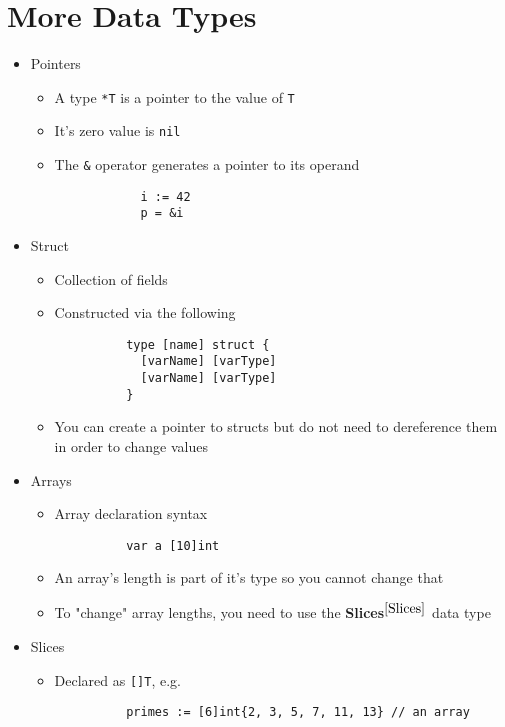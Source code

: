 \documentclass[11pt, oneside]{article}   	%
\begin{document}
\section{More Data Types}
  \begin{itemize}
    \item Pointers
      \begin{itemize}
        \item A type \texttt{*T} is a pointer to the value of \texttt{T}
        \item It's zero value is \texttt{nil}
        \item The \texttt{\&} operator generates a pointer to its operand
          \begin{verbatim}
            i := 42
            p = &i
          \end{verbatim}
      \end{itemize}
    \item Struct
      \begin{itemize}
        \item Collection of fields
        \item Constructed via the following
          \begin{verbatim}
          type [name] struct {
            [varName] [varType]
            [varName] [varType]
          }
          \end{verbatim}
        \item You can create a pointer to structs but do not need to dereference them in order to change values
      \end{itemize}
    \item Arrays
      \begin{itemize}
        \item Array declaration syntax
          \begin{verbatim}
          var a [10]int
          \end{verbatim}
        \item An array's length is part of it's type so you cannot change that
        \item To "change" array lengths, you need to use the \textbf{Slices}$^{\ref{Slices}}$ data type
      \end{itemize}
    \item Slices \label{Slices}
      \begin{itemize}
        \item Declared as \texttt{[]T}, e.g.
        \begin{verbatim}
          primes := [6]int{2, 3, 5, 7, 11, 13} // an array

\end{verbatim}
\end{itemize}
\end{itemize}
\end{document}
